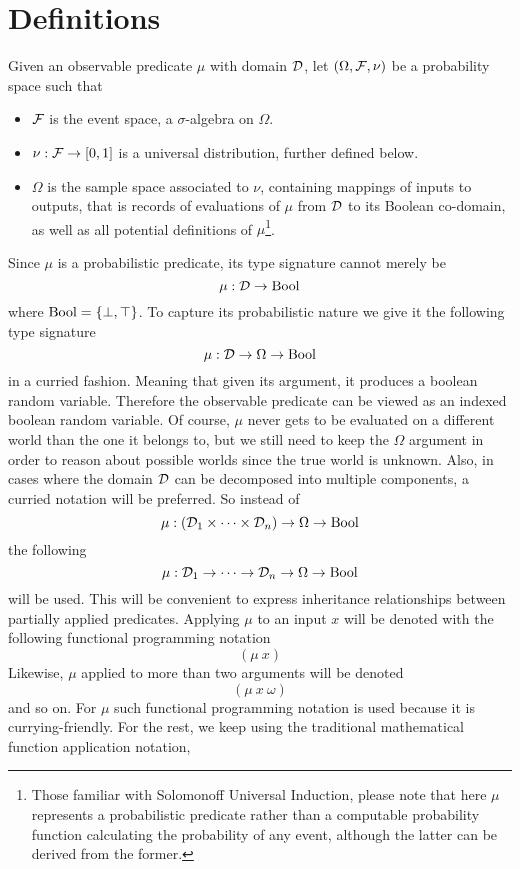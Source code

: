 \documentclass[]{article}
\begin{document}
\section{Definitions}
Given an observable predicate $\mu$ with domain $\mathcal{D}$, let
$(\Omega, \mathcal{F}, \nu)$ be a probability space such that
\begin{itemize}
\item $\mathcal{F}$ is the event space, a $\sigma$-algebra on $\Omega$.
\item $\nu : \mathcal{F} \to [0, 1]$ is a universal distribution, further
  defined below.
\item $\Omega$ is the sample space associated to $\nu$, containing
  mappings of inputs to outputs, that is records of evaluations of
  $\mu$ from $\mathcal{D}$ to its Boolean co-domain, as well as all
  potential definitions of $\mu$\footnote{Those familiar with
  Solomonoff Universal Induction, please note that here $\mu$
  represents a probabilistic predicate rather than a computable
  probability function calculating the probability of any event,
  although the latter can be derived from the former.}.
\end{itemize}
Since $\mu$ is a probabilistic predicate, its type signature cannot
merely be
$$\mu : \mathcal{D} \to \textup{Bool}$$ where $\textup{Bool} = \{\bot, \top\}$.  To capture
its probabilistic nature we give it the following type signature
$$\mu : \mathcal{D} \to \Omega \to \textup{Bool}$$ in a curried fashion.  Meaning
that given its argument, it produces a boolean random variable.
Therefore the observable predicate can be viewed as an indexed boolean
random variable.  Of course, $\mu$ never gets to be evaluated on a
different world than the one it belongs to, but we still need to keep
the $\Omega$ argument in order to reason about possible worlds since
the true world is unknown.  Also, in cases where the domain $\mathcal{D}$
can be decomposed into multiple components, a curried notation will be
preferred.  So instead of
$$\mu : (\mathcal{D}_1 \times \dots \times \mathcal{D}_n) \to \Omega \to \textup{Bool}$$
the following
$$\mu : \mathcal{D}_1 \to \dots \to \mathcal{D}_n \to \Omega \to \textup{Bool}$$ will
be used.  This will be convenient to express inheritance relationships
between partially applied predicates.  Applying $\mu$ to an input $x$
will be denoted with the following functional programming notation
$$(\mu\ x)$$ Likewise, $\mu$ applied to more than two arguments will
be denoted
$$(\mu\ x\ \omega)$$ and so on.  For $\mu$ such functional programming
notation is used because it is currying-friendly.  For the rest, we
keep using the traditional mathematical function application notation,
\end{document}
